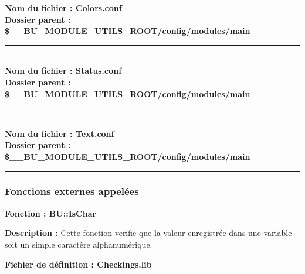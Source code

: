 \documentclass[a4paper,10pt]{article}
\begin{document}
\textbf{Nom du fichier : \color{lime}Colors.conf}\\[1\baselineskip]

\textbf{Dossier parent : \color{orange}\$\_\_BU\_MODULE\_UTILS\_ROOT\color{lime}/config/modules/main}\\[1\baselineskip]



\color{lime}\par\noindent\rule{\textwidth}{0.4pt}\color{white}\\[1\baselineskip]

\textbf{Nom du fichier : \color{lime}Status.conf}\\[1\baselineskip]

\textbf{Dossier parent : \color{orange}\$\_\_BU\_MODULE\_UTILS\_ROOT\color{lime}/config/modules/main}\\[1\baselineskip]



\color{lime}\par\noindent\rule{\textwidth}{0.4pt}\color{white}\\[1\baselineskip]

\textbf{Nom du fichier : \color{lime}Text.conf}\\[1\baselineskip]

\textbf{Dossier parent : \color{orange}\$\_\_BU\_MODULE\_UTILS\_ROOT\color{lime}/config/modules/main}\\[1\baselineskip]



\color{blue}\par\noindent\rule{\textwidth}{0.4pt}\color{white}

\color{blue}
\subsubsection{Fonctions externes appelées}\color{white}

\textbf{Fonction : \color{mauve}BU::IsChar}\\[1\baselineskip]

\begin{justify}
    \textbf{Description :} Cette fonction verifie que la valeur enregistrée dans une variable soit un simple caractère alphanumérique.
\end{justify}

\textbf{Fichier de définition : \color{lime}Checkings.lib}\\[1\baselineskip]
\end{document}
